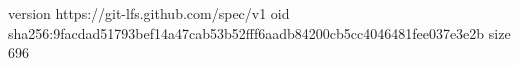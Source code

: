 version https://git-lfs.github.com/spec/v1
oid sha256:9facdad51793bef14a47cab53b52fff6aadb84200cb5cc4046481fee037e3e2b
size 696
